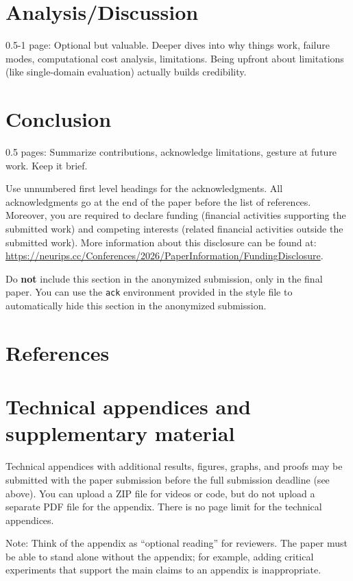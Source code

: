 \documentclass{article}
\begin{document}
\section{Analysis/Discussion}
\label{sec:disc}
0.5-1 page: Optional but valuable. Deeper dives into why things work, failure modes, computational cost analysis, limitations. Being upfront about limitations (like single-domain evaluation) actually builds credibility.

\section{Conclusion}
\label{sec:conc}
0.5 pages: Summarize contributions, acknowledge limitations, gesture at future work. Keep it brief.




\begin{ack}
Use unnumbered first level headings for the acknowledgments. All acknowledgments
go at the end of the paper before the list of references. Moreover, you are required to declare
funding (financial activities supporting the submitted work) and competing interests (related financial activities outside the submitted work).
More information about this disclosure can be found at: \url{https://neurips.cc/Conferences/2026/PaperInformation/FundingDisclosure}.


Do {\bf not} include this section in the anonymized submission, only in the final paper. You can use the \texttt{ack} environment provided in the style file to automatically hide this section in the anonymized submission.
\end{ack}

\section*{References}




\appendix

\section{Technical appendices and supplementary material}
Technical appendices with additional results, figures, graphs, and proofs may be submitted with the paper submission before the full submission deadline (see above). You can upload a ZIP file for videos or code, but do not upload a separate PDF file for the appendix. There is no page limit for the technical appendices. 

Note: Think of the appendix as ``optional reading'' for reviewers. The paper must be able to stand alone without the appendix; for example, adding critical experiments that support the main claims to an appendix is inappropriate. 


\newpage

\end{document}
